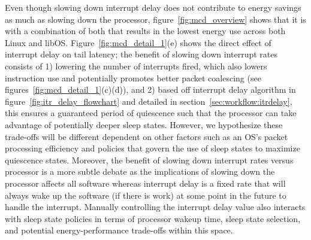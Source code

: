 Even though slowing down interrupt delay does not contribute to energy savings as much as slowing down the processor, figure~\ref{fig:mcd_overview} shows that it is  with a combination of both that results in the lowest energy use across both Linux and libOS. Figure~\ref{fig:mcd_detail_1}(e) shows the direct effect of interrupt delay on tail latency; the benefit of slowing down interrupt rates consists of 1) lowering the number of interrupts fired, which also lowers instruction use and potentially promotes better packet coalescing (see figures~\ref{fig:mcd_detail_1}(c)(d)), and 2) based off interrupt delay algorithm in figure~\ref{fig:itr_delay_flowchart} and detailed in section~\ref{sec:workflow:itrdelay}, this ensures a guaranteed period of quiescence such that the processor can take advantage of potentially deeper sleep states. However, we hypothesize these trade-offs will be different dependent on other factors such as an OS's packet processing efficiency and policies that govern the use of sleep states to maximize quiescence states. Moreover, the benefit of slowing down interrupt rates versus processor is a more subtle debate as the implications of slowing down the processor affects all software whereas interrupt delay is a fixed rate that will always wake up the software (if there is work) at some point in the future to handle the interrupt. Manually controlling the interrupt delay value also interacts with sleep state policies in terms of processor wakeup time, sleep state selection, and potential energy-performance trade-offs within this space. 





